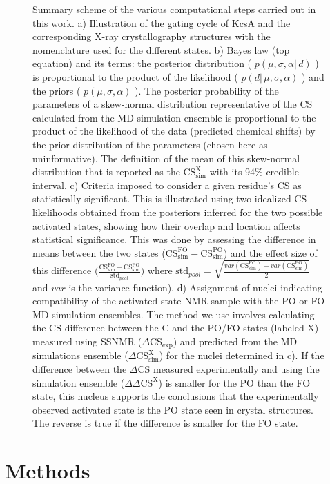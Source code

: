 \documentclass[%
 aip,
 amsmath,amssymb,
 preprint,%
]{revtex4-1}
\begin{document}
\begin{figure}
{Summary scheme of the various computational steps carried out in this work. a) Illustration of the gating cycle of KcsA and the corresponding X-ray crystallography structures with the nomenclature used for the different states. b) Bayes law (top equation) and its terms: the posterior distribution ( $p( \mu, \sigma, \alpha |\, d)$ ) is proportional to the product of the likelihood ( $p( d |\, \mu, \sigma, \alpha )$ ) and the priors ( $p( \mu, \sigma, \alpha )$ ). The posterior probability of the parameters of a skew-normal distribution representative of the CS calculated from the MD simulation ensemble is proportional to the product of the likelihood of the data (predicted chemical shifts) by the prior distribution of the parameters (chosen here as uninformative). The definition of the mean of this skew-normal distribution that is reported as the $\text{CS}_{\text{sim}}^{\text{X}}$ with its 94\% credible interval. c) Criteria imposed to consider a given residue's CS as statistically significant. This is illustrated using two idealized CS-likelihoods obtained from the posteriors inferred for the two possible activated states, showing how their overlap and location affects statistical significance. This was done by assessing the difference in means between the two states ($\text{CS}_{\text{sim}}^{\text{FO}}-\text{CS}_{\text{sim}}^{\text{PO}}$) and the effect size of this difference $\big(\frac{\text{CS}_{\text{sim}}^{\text{FO}}-\text{CS}_{\text{sim}}^{\text{PO}}}{\text{std}_{pool}}\big)$ where $\text{std}_{pool}=\sqrt{\frac{var(\text{CS}^{\text{FO}}_{\text{sim}})-var(\text{CS}^{\text{PO}}_{\text{sim}})}{2}}$ and $var$ is the variance function). d) Assignment of nuclei indicating compatibility of the activated state NMR sample with the PO or FO MD simulation ensembles. The method we use involves calculating the CS difference between the C and the PO/FO states (labeled X) measured using SSNMR ($\Delta \text{CS}_\text{exp}$) and predicted from the MD simulations ensemble ($\Delta \text{CS}_\text{sim}^\text{X}$) for the nuclei determined in c). If the difference between the $\Delta \text{CS}$ measured experimentally and using the simulation ensemble ($\Delta\Delta \text{CS}^\text{X}$) is smaller for the PO than the FO state, this nucleus supports the conclusions that the experimentally observed activated state is the PO state seen in crystal structures. The reverse is true if the difference is smaller for the FO state.
}
\end{figure}

\section{Methods}
\end{document}
